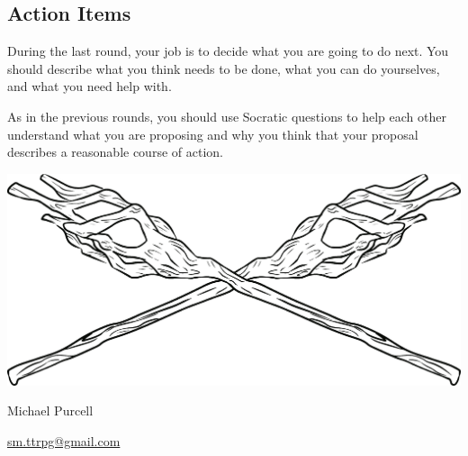 \documentclass[a6paper, 11pt, parskip=half]{scrartcl}
\begin{document}
\newpage
\enlargethispage{3.5\baselineskip}

\subsection*{Action Items}
During the last round, your job is to decide what you are going to do next.
You should describe what you think needs to be done, what you can do yourselves, and what you need help with.

As in the previous rounds, you should use Socratic questions to help each other understand what you are proposing and why you think that your proposal describes a reasonable course of action.

\vfill
\begin{center}
\includegraphics[scale=0.09]{Images/druid_Staff.png}
\end{center}
\vfill
\begin{description}[nosep]
\item[\textbf{Design}:] Michael Purcell \\
\item[\textbf{Contact}:] \href{mailto:sm.ttrpg@gmail.com}{sm.ttrpg@gmail.com}\\
\item[\textbf{License}:] \doclicenseText%
\end{description}
\end{document}
